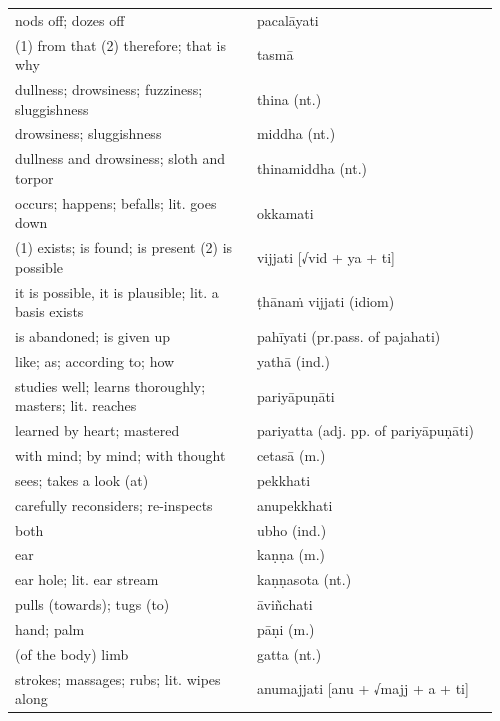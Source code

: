 \documentclass[11pt,oneside]{memoir}
\begin{document}
\normalArrayStrech

\clearpage

\begin{longtable}{L{0.48\linewidth} L{0.48\linewidth}}
nods off; dozes off & pacalāyati\\[0pt]
(1) from that (2) therefore; that is why & tasmā\\[0pt]
dullness; drowsiness; fuzziness; sluggishness & thina (nt.)\\[0pt]
drowsiness; sluggishness & middha (nt.)\\[0pt]
dullness and drowsiness; sloth and torpor & thinamiddha (nt.)\\[0pt]
occurs; happens; befalls; lit. goes down & okkamati\\[0pt]
(1) exists; is found; is present (2) is possible & vijjati [√vid + ya + ti]\\[0pt]
it is possible, it is plausible; lit. a basis exists & ṭhānaṁ vijjati (idiom)\\[0pt]
is abandoned; is given up & pahīyati (pr.pass. of pajahati)\\[0pt]
like; as; according to; how & yathā (ind.)\\[0pt]
studies well; learns thoroughly; masters; lit. reaches & pariyāpuṇāti\\[0pt]
learned by heart; mastered & pariyatta (adj. pp. of pariyāpuṇāti)\\[0pt]
with mind; by mind; with thought & cetasā (m.)\\[0pt]
sees; takes a look (at) & pekkhati\\[0pt]
carefully reconsiders; re-inspects & anupekkhati\\[0pt]
both & ubho (ind.)\\[0pt]
ear & kaṇṇa (m.)\\[0pt]
ear hole; lit. ear stream & kaṇṇasota (nt.)\\[0pt]
pulls (towards); tugs (to) & āviñchati\\[0pt]
hand; palm & pāṇi (m.)\\[0pt]
(of the body) limb & gatta (nt.)\\[0pt]
strokes; massages; rubs; lit. wipes along & anumajjati [anu + √majj + a + ti]\\[0pt]
\end{longtable}

\bigskip
\end{document}
